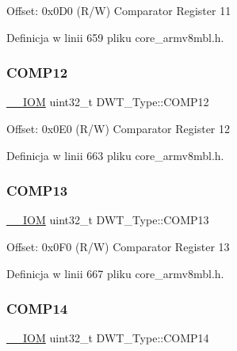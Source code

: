 Offset\+: 0x0\+D0 (R/W) Comparator Register 11 

Definicja w linii 659 pliku core\+\_\+armv8mbl.\+h.

\mbox{\label{struct_d_w_t___type_a9115fd187d8cbcb9d6ec5eba938b81ea}} 
\subsubsection{\texorpdfstring{C\+O\+M\+P12}{COMP12}}
{\footnotesize\ttfamily \hyperlink{core__sc300_8h_ab6caba5853a60a17e8e04499b52bf691}{\+\_\+\+\_\+\+I\+OM} uint32\+\_\+t D\+W\+T\+\_\+\+Type\+::\+C\+O\+M\+P12}

Offset\+: 0x0\+E0 (R/W) Comparator Register 12 

Definicja w linii 663 pliku core\+\_\+armv8mbl.\+h.

\mbox{\label{struct_d_w_t___type_abc29ac14df61ec3f8f3d28ca92892d8a}} 
\subsubsection{\texorpdfstring{C\+O\+M\+P13}{COMP13}}
{\footnotesize\ttfamily \hyperlink{core__sc300_8h_ab6caba5853a60a17e8e04499b52bf691}{\+\_\+\+\_\+\+I\+OM} uint32\+\_\+t D\+W\+T\+\_\+\+Type\+::\+C\+O\+M\+P13}

Offset\+: 0x0\+F0 (R/W) Comparator Register 13 

Definicja w linii 667 pliku core\+\_\+armv8mbl.\+h.

\mbox{\label{struct_d_w_t___type_a85368a4ec78f4074e5f9cbba92ae1eb9}} 
\subsubsection{\texorpdfstring{C\+O\+M\+P14}{COMP14}}
{\footnotesize\ttfamily \hyperlink{core__sc300_8h_ab6caba5853a60a17e8e04499b52bf691}{\+\_\+\+\_\+\+I\+OM} uint32\+\_\+t D\+W\+T\+\_\+\+Type\+::\+C\+O\+M\+P14}

